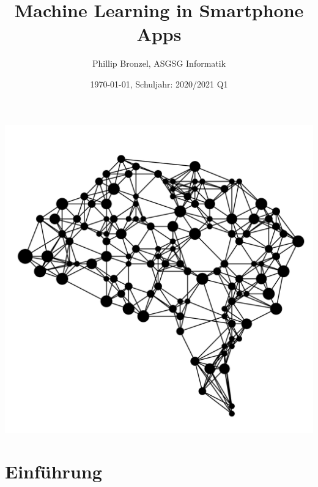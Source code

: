 \documentclass[12pt]{article}
\title{Machine Learning in Smartphone Apps}
\date{\today, Schuljahr: 2020/2021 Q1}
\author{Phillip Bronzel, ASGSG Informatik}
\begin{document}
  \maketitle
  \centering
    \includegraphics[totalheight=10cm]{titlepage.png}
  \newpage
  \tableofcontents
  \newpage
  \section{Einführung}
  
\end{document}
